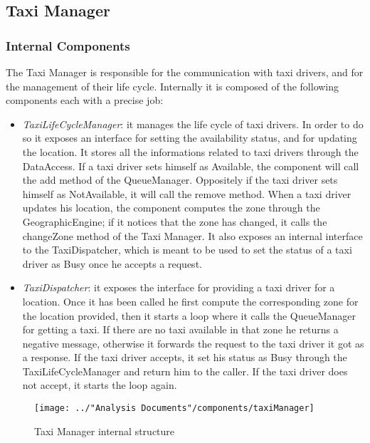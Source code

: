 \subsection{Taxi Manager}\label{comp:taxiManager}
\subsubsection{Internal Components}
The Taxi Manager is responsible for the communication with taxi drivers, and for the management of their life cycle. Internally it is composed of the following components each with a precise job:
\begin{itemize}
	\item \textit{TaxiLifeCycleManager}: it manages the life cycle of taxi drivers. In order to do so it exposes an interface for setting the availability status, and for updating the location. It stores all the informations related to taxi drivers through the DataAccess. If a taxi driver sets himself as Available, the component will call the add method of the QueueManager. Oppositely if the taxi driver sets himself as NotAvailable, it will call the remove method. When a taxi driver updates his location, the component computes the zone through the GeographicEngine; if it notices that the zone has changed, it calls the changeZone method of the Taxi Manager. It also exposes an internal interface to the TaxiDispatcher, which is meant to be used to set the status of a taxi driver as Busy once he accepts a request.
	\item \textit{TaxiDispatcher}: it exposes the interface for providing a taxi driver for a location. Once it has been called he first compute the corresponding zone for the location provided, then it starts a loop where it calls the QueueManager for getting a taxi. If there are no taxi available in that zone he returns a negative message, otherwise it forwards the request to the taxi driver it got as a response. If the taxi driver accepts, it set his status as Busy through the TaxiLifeCycleManager and return him to the caller. If the taxi driver does not accept, it starts the loop again.
\end{itemize}
\begin{figure}[H]
	\centering
	\texttt{[image: ../"Analysis Documents"/components/taxiManager]}
	\label{fig:taximanager}
	\caption{Taxi Manager internal structure}
\end{figure}
